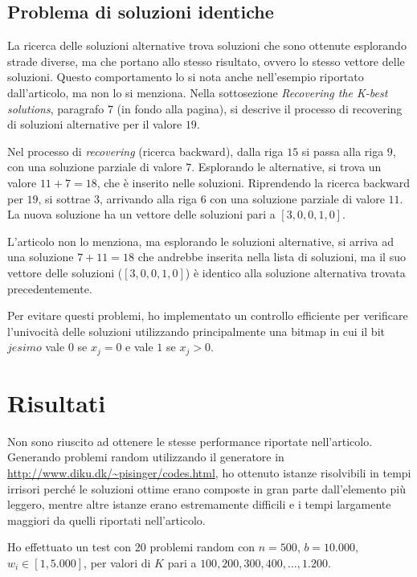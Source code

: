 \subsection{Problema di soluzioni identiche}

La ricerca delle soluzioni alternative trova soluzioni che sono ottenute
esplorando strade diverse, ma che portano allo stesso risultato, ovvero lo
stesso vettore delle soluzioni. Questo comportamento lo si nota anche
nell'esempio riportato dall'articolo, ma non lo si menziona. Nella sottosezione
\emph{Recovering the K-best solutions}, paragrafo 7 (in fondo alla pagina), si
descrive il processo di recovering di soluzioni alternative per il valore $19$.

Nel processo di \emph{recovering} (ricerca backward), dalla riga $15$ si passa
alla riga $9$, con una soluzione parziale di valore $7$. Esplorando le
alternative, si trova un valore $11+7 = 18$, che è inserito nelle soluzioni.
Riprendendo la ricerca backward per $19$, si sottrae $3$, arrivando alla riga
$6$ con una soluzione parziale di valore $11$. La nuova soluzione ha un vettore
delle soluzioni pari a $[3,0,0,1,0]$.

L'articolo non lo menziona, ma esplorando le soluzioni alternative, si arriva
ad una soluzione $7 + 11=18$ che andrebbe inserita nella lista di soluzioni, ma
il suo vettore delle soluzioni ($[3,0,0,1,0]$) è identico alla soluzione
alternativa trovata precedentemente.

Per evitare questi problemi, ho implementato un controllo efficiente per
verificare l'univocità delle soluzioni utilizzando principalmente una bitmap in
cui il bit $jesimo$ vale $0$ se $x_j=0$ e vale $1$ se $x_j > 0$.

\section{Risultati}

Non sono riuscito ad ottenere le stesse performance riportate nell'articolo.
Generando problemi random utilizzando il generatore in
\url{http://www.diku.dk/~pisinger/codes.html}, ho ottenuto istanze risolvibili
in tempi irrisori perch\'e le soluzioni ottime erano composte in gran parte
dall'elemento più leggero, mentre altre istanze erano estremamente difficili e
i tempi largamente maggiori da quelli riportati nell'articolo.

Ho effettuato un test con $20$ problemi random con $n = 500$, $b = 10.000$, $w_i
\in [1,5.000]$, per valori di $K$ pari a $100, 200, 300, 400, \dots, 1.200$.

